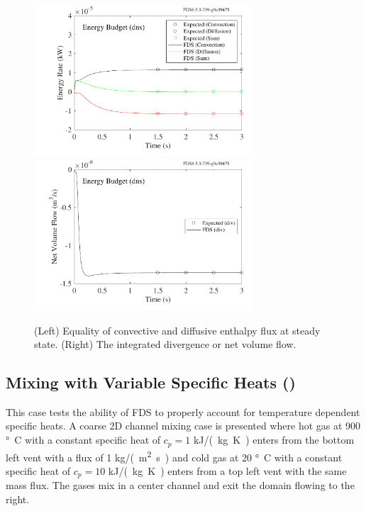 \documentclass[11pt]{book}
\begin{document}
\begin{figure}[ht]
\includegraphics[width=3.2in]{SCRIPT_FIGURES/energy_budget_dns_heat}
\includegraphics[width=3.2in]{SCRIPT_FIGURES/energy_budget_dns_div}
\caption[The  test case]{(Left) Equality of convective and diffusive enthalpy flux at steady state. (Right) The integrated divergence or net volume flow.}
\label{energy_budget_dns}
\end{figure}

\clearpage


\subsection{Mixing with Variable Specific Heats (\texorpdfstring{}{energy\_budget\_tmix})}

This case tests the ability of FDS to properly account for temperature dependent specific heats.  A coarse 2D channel mixing case is presented where hot gas at 900 \si{\degree C} with a constant specific heat of $c_p=1$ \si{kJ/(kg.K)} enters from the bottom left vent with a flux of 1 \si{kg/(m^2.s)} and cold gas at 20 \si{\degree C} with a constant specific heat of $c_p=10$ \si{kJ/(kg.K)} enters from a top left vent with the same mass flux.  The gases mix in a center channel and exit the domain flowing to the right.
\end{document}
